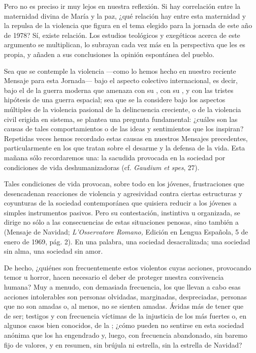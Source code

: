 Pero no es preciso ir muy lejos en nuestra reflexión. Si hay correlación entre la maternidad divina de María y la paz, ¿qué relación hay entre esta maternidad y la repulsa de la violencia que figura en el tema elegido para la jornada de este año de 1978? Sí, existe relación. Los estudios teológicos y exegéticos acerca de este argumento se multiplican, lo subrayan cada vez más en la perspectiva que les es propia, y añaden a sus conclusiones la opinión espontánea del pueblo.

Sea que se contemple la violencia ---como lo hemos hecho en nuestro reciente Mensaje para esta Jornada--- bajo el aspecto colectivo internacional, es decir, bajo el de la guerra moderna que amenaza con su , con su , y con las tristes hipótesis de una guerra espacial; sea que se la considere bajo los aspectos múltiples de la violencia pasional de la delincuencia creciente, o de la violencia civil erigida en sistema, se plantea una pregunta fundamental: ¿cuáles son las causas de tales comportamientos o de las ideas y sentimientos que los inspiran? Repetidas veces hemos recordado estas causas en nuestros Mensajes precedentes, particularmente en los que tratan sobre el desarme y la defensa de la vida. Esta mañana sólo recordaremos una: la sacudida provocada en la sociedad por condiciones de vida deshumanizadoras (cf. \emph{Gaudium et spes}, 27).

Tales condiciones de vida provocan, sobre todo en los jóvenes, frustraciones que desencadenan reacciones de violencia y agresividad contra ciertas estructuras y coyunturas de la sociedad contemporánea que quisiera reducir a los jóvenes a simples instrumentos pasivos. Pero su contestación, instintiva u organizada, se dirige no sólo a las consecuencias de estas situaciones penosas, sino también a  (Mensaje de Navidad; \emph{L'Osservatore Romano,} Edición en Lengua Española, 5 de enero de 1969, pág. 2). En una palabra, una sociedad desacralizada; una sociedad sin alma, una sociedad sin amor.

De hecho, ¿quiénes son frecuentemente estos violentos cuyas acciones, provocando temor u horror, hacen necesario el deber de proteger nuestra convivencia humana? Muy a menudo, con demasiada frecuencia, los que llevan a cabo esas acciones intolerables son personas olvidadas, marginadas, despreciadas, personas que no son amadas o, al menos, no se sienten amadas. Ávidas más de tener que de ser; testigos y con frecuencia víctimas de la injusticia de los más fuertes o, en algunos casos bien conocidos, de la ; ¿cómo pueden no sentirse  en esta sociedad anónima que los ha engendrado y, luego, con frecuencia abandonado, sin baremo fijo de valores, y en resumen, sin brújula ni estrella, sin la estrella de Navidad?

